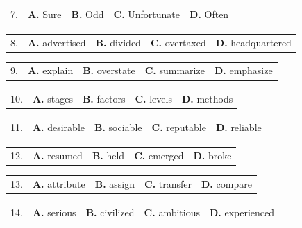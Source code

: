 \documentclass[UTF8,11pt]{ctexart}
\begin{document}
\noindent\begin{tabularx}{\linewidth}{@{}lXXXX@{}}7. & \textbf{A.} Sure & \textbf{B.} Odd & \textbf{C.} Unfortunate & \textbf{D.} Often\\\end{tabularx}\par

\noindent\begin{tabularx}{\linewidth}{@{}lXXXX@{}}8. & \textbf{A.} advertised & \textbf{B.} divided & \textbf{C.} overtaxed & \textbf{D.} headquartered\\\end{tabularx}\par

\noindent\begin{tabularx}{\linewidth}{@{}lXXXX@{}}9. & \textbf{A.} explain & \textbf{B.} overstate & \textbf{C.} summarize & \textbf{D.} emphasize\\\end{tabularx}\par

\noindent\begin{tabularx}{\linewidth}{@{}lXXXX@{}}10. & \textbf{A.} stages & \textbf{B.} factors & \textbf{C.} levels & \textbf{D.} methods\\\end{tabularx}\par

\noindent\begin{tabularx}{\linewidth}{@{}lXXXX@{}}11. & \textbf{A.} desirable & \textbf{B.} sociable & \textbf{C.} reputable & \textbf{D.} reliable\\\end{tabularx}\par

\noindent\begin{tabularx}{\linewidth}{@{}lXXXX@{}}12. & \textbf{A.} resumed & \textbf{B.} held & \textbf{C.} emerged & \textbf{D.} broke\\\end{tabularx}\par

\noindent\begin{tabularx}{\linewidth}{@{}lXXXX@{}}13. & \textbf{A.} attribute & \textbf{B.} assign & \textbf{C.} transfer & \textbf{D.} compare\\\end{tabularx}\par

\noindent\begin{tabularx}{\linewidth}{@{}lXXXX@{}}14. & \textbf{A.} serious & \textbf{B.} civilized & \textbf{C.} ambitious & \textbf{D.} experienced\\\end{tabularx}\par
\end{document}
